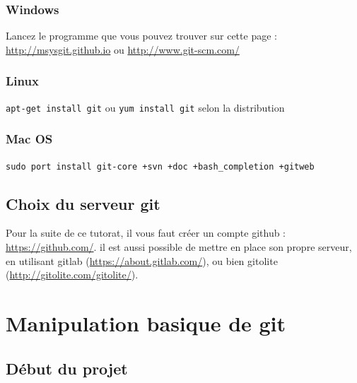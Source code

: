\documentclass[a4paper,10pt]{report}
\begin{document}
    \subsection{Windows}
Lancez le programme que vous pouvez trouver sur cette page : \url{http://msysgit.github.io} ou \url{http://www.git-scm.com/}
    \subsection{Linux}
\verb|apt-get install git| ou \verb|yum install git| selon la distribution
    \subsection{Mac OS}
\verb|sudo port install git-core +svn +doc +bash_completion +gitweb|
  \section{Choix du serveur git}
Pour la suite de ce tutorat, il vous faut créer un compte github : \url{https://github.com/}.
il est aussi possible de mettre en place son propre serveur, en utilisant gitlab (\url{https://about.gitlab.com/}), ou bien gitolite (\url{http://gitolite.com/gitolite/}).
\chapter{Manipulation basique de git}
  \section{D\'ebut du projet}
\end{document}
